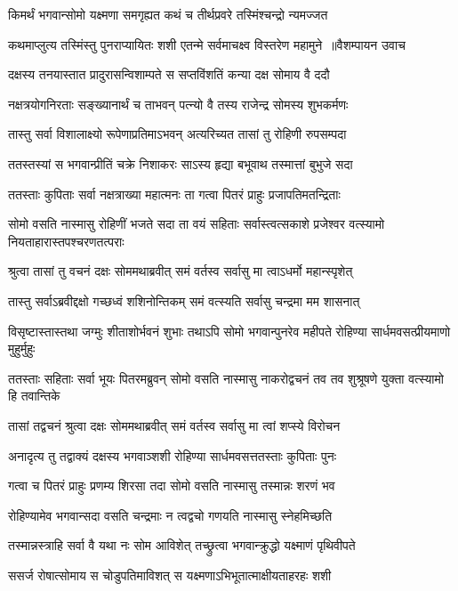 \twolineshloka
{किमर्थं भगवान्सोमो यक्ष्मणा समगृह्यत}
{कथं च तीर्थप्रवरे तस्मिंश्चन्द्रो न्यमज्जत}


\threelineshloka
{कथमाप्लुत्य तस्मिंस्तु पुनराप्यायितः शशी}
{एतन्मे सर्वमाचक्ष्व विस्तरेण महामुने ॥वैशम्पायन उवाच}
{}


\twolineshloka
{दक्षस्य तनयास्तात प्रादुरासन्विशाम्पते}
{स सप्तविंशतिं कन्या दक्ष सोमाय वै ददौ}


\twolineshloka
{नक्षत्रयोगनिरताः सङ्ख्यानार्थं च ताभवन्}
{पत्न्यो वै तस्य राजेन्द्र सोमस्य शुभकर्मणः}


\twolineshloka
{तास्तु सर्वा विशालाक्ष्यो रूपेणाप्रतिमाऽभवन्}
{अत्यरिच्यत तासां तु रोहिणी रुपसम्पदा}


\twolineshloka
{ततस्तस्यां स भगवान्प्रीतिं चक्रे निशाकरः}
{साऽस्य हृद्या बभूवाथ तस्मात्तां बुभुजे सदा}


\twolineshloka
{ततस्ताः कुपिताः सर्वा नक्षत्राख्या महात्मनः}
{ता गत्वा पितरं प्राहुः प्रजापतिमतन्द्रिताः}


\threelineshloka
{सोमो वसति नास्मासु रोहिणीं भजते सदा}
{ता वयं सहिताः सर्वास्त्वत्सकाशे प्रजेश्वर}
{वत्स्यामो नियताहारास्तपश्चरणतत्पराः}


\twolineshloka
{श्रुत्वा तासां तु वचनं दक्षः सोममथाब्रवीत्}
{समं वर्तस्व सर्वासु मा त्वाऽधर्मो महान्स्पृशेत्}


\twolineshloka
{तास्तु सर्वाऽब्रवीद्दक्षो गच्छध्वं शशिनोन्तिकम्}
{समं वत्स्यति सर्वासु चन्द्रमा मम शासनात्}


\threelineshloka
{विसृष्टास्तास्तथा जग्मुः शीताशोर्भवनं शुभाः}
{तथाऽपि सोमो भगवान्पुनरेव महीपते}
{रोहिण्या सार्धमवसत्प्रीयमाणो मुहुर्मुहुः}


ततस्ताः सहिताः सर्वा भूयः पितरमब्रुवन्
\twolineshloka
{सोमो वसति नास्मासु नाकरोद्वचनं तव}
{तव शुश्रूषणे युक्ता वत्स्यामो हि तवान्तिके}


\twolineshloka
{तासां तद्वचनं श्रुत्वा दक्षः सोममथाब्रवीत्}
{समं वर्तस्व सर्वासु मा त्वां शप्स्ये विरोचन}


\twolineshloka
{अनादृत्य तु तद्वाक्यं दक्षस्य भगवाञ्शशी}
{रोहिण्या सार्धमवसत्ततस्ताः कुपिताः पुनः}


\twolineshloka
{गत्वा च पितरं प्राहुः प्रणम्य शिरसा तदा}
{सोमो वसति नास्मासु तस्मान्नः शरणं भव}


\twolineshloka
{रोहिण्यामेव भगवान्सदा वसति चन्द्रमाः}
{न त्वद्वचो गणयति नास्मासु स्नेहमिच्छति}


\twolineshloka
{तस्मान्नस्त्राहि सर्वा वै यथा नः सोम आविशेत्}
{तच्छ्रुत्वा भगवान्क्रुद्धो यक्ष्माणं पृथिवीपते}


\twolineshloka
{ससर्ज रोषात्सोमाय स चोडुपतिमाविशत्}
{स यक्ष्मणाऽभिभूतात्माक्षीयताहरहः शशी}


